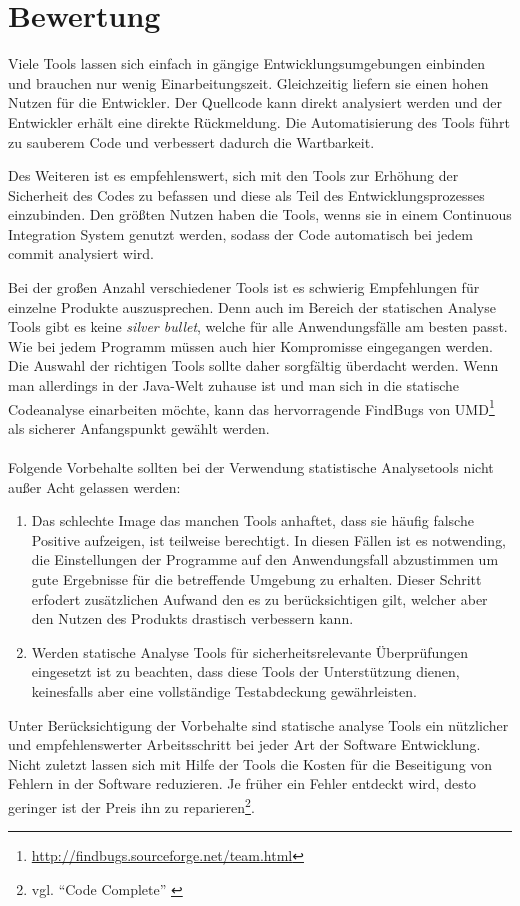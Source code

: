 \section{Bewertung}
Viele Tools lassen sich einfach in gängige Entwicklungsumgebungen einbinden und brauchen nur wenig Einarbeitungszeit. Gleichzeitig liefern sie einen hohen Nutzen für die Entwickler. Der Quellcode kann direkt analysiert werden und der Entwickler erhält eine direkte Rückmeldung. Die Automatisierung des Tools führt zu sauberem Code und verbessert dadurch die Wartbarkeit.

Des Weiteren ist es empfehlenswert, sich mit den Tools zur Erhöhung der Sicherheit des Codes zu befassen und diese als Teil des Entwicklungsprozesses einzubinden. Den größten Nutzen haben die Tools, wenns sie in einem Continuous Integration System genutzt werden, sodass der Code automatisch bei jedem commit analysiert wird.

Bei der großen Anzahl verschiedener Tools ist es schwierig Empfehlungen für einzelne Produkte auszusprechen. Denn auch im Bereich der statischen Analyse Tools gibt es keine \emph{silver bullet}, welche für alle Anwendungsfälle am besten passt. Wie bei jedem Programm müssen auch hier Kompromisse eingegangen werden. Die Auswahl der richtigen Tools sollte daher sorgfältig überdacht werden. Wenn man allerdings in der Java-Welt zuhause ist und man sich in die statische Codeanalyse einarbeiten möchte, kann das hervorragende FindBugs von UMD\footnote{\url{http://findbugs.sourceforge.net/team.html}} als sicherer Anfangspunkt gewählt werden.
\\\\
Folgende Vorbehalte sollten bei der Verwendung statistische Analysetools nicht außer Acht gelassen werden:
\begin{enumerate}
  \item Das schlechte Image das manchen Tools anhaftet, dass sie häufig falsche Positive aufzeigen, ist teilweise berechtigt. In diesen Fällen ist es notwending, die Einstellungen der Programme auf den Anwendungsfall abzustimmen um gute Ergebnisse für die betreffende Umgebung zu erhalten. Dieser Schritt erfodert zusätzlichen Aufwand den es zu berücksichtigen gilt, welcher aber den Nutzen des Produkts drastisch verbessern kann.
  \item Werden statische Analyse Tools für sicherheitsrelevante Überprüfungen eingesetzt ist zu beachten, dass diese Tools der Unterstützung dienen, keinesfalls aber eine vollständige Testabdeckung gewährleisten.
\end{enumerate}

Unter Berücksichtigung der Vorbehalte sind statische analyse Tools ein nützlicher und empfehlenswerter Arbeitsschritt bei jeder  Art der Software Entwicklung. Nicht zuletzt lassen sich mit Hilfe der Tools die Kosten für die Beseitigung von Fehlern in der Software reduzieren. Je früher ein Fehler entdeckt wird, desto geringer ist der Preis ihn zu reparieren\footnote{vgl. ``Code Complete'' \citep{mcconnell2004}}.
